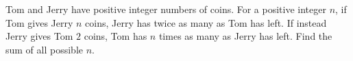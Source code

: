 Tom and Jerry have positive integer numbers of coins. For a positive integer $n$, if Tom gives Jerry $n$ coins, Jerry has twice as many as Tom has left. If instead Jerry gives Tom $2$ coins, Tom has $n$ times as many as Jerry has left. Find the sum of all possible $n$.
